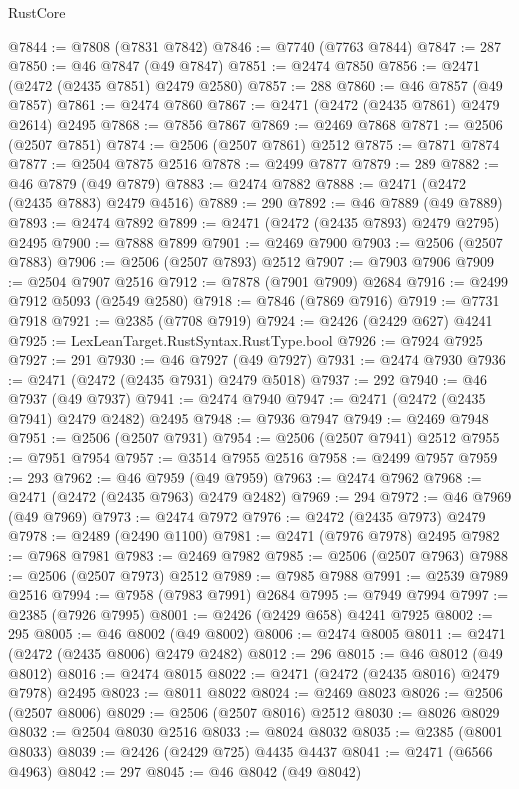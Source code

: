 \begin{lexlean}{RustCore}
\begin{coremodule}
@7844 := @7808 (@7831 @7842)
@7846 := @7740 (@7763 @7844)
@7847 := 287
@7850 := @46 @7847 (@49 @7847)
@7851 := @2474 @7850
@7856 := @2471 (@2472 (@2435 @7851) @2479 @2580)
@7857 := 288
@7860 := @46 @7857 (@49 @7857)
@7861 := @2474 @7860
@7867 := @2471 (@2472 (@2435 @7861) @2479 @2614) @2495
@7868 := @7856 @7867
@7869 := @2469 @7868
@7871 := @2506 (@2507 @7851)
@7874 := @2506 (@2507 @7861) @2512
@7875 := @7871 @7874
@7877 := @2504 @7875 @2516
@7878 := @2499 @7877
@7879 := 289
@7882 := @46 @7879 (@49 @7879)
@7883 := @2474 @7882
@7888 := @2471 (@2472 (@2435 @7883) @2479 @4516)
@7889 := 290
@7892 := @46 @7889 (@49 @7889)
@7893 := @2474 @7892
@7899 := @2471 (@2472 (@2435 @7893) @2479 @2795) @2495
@7900 := @7888 @7899
@7901 := @2469 @7900
@7903 := @2506 (@2507 @7883)
@7906 := @2506 (@2507 @7893) @2512
@7907 := @7903 @7906
@7909 := @2504 @7907 @2516
@7912 := @7878 (@7901 @7909) @2684
@7916 := @2499 @7912 @5093 (@2549 @2580)
@7918 := @7846 (@7869 @7916)
@7919 := @7731 @7918
@7921 := @2385 (@7708 @7919)
@7924 := @2426 (@2429 @627) @4241
@7925 := LexLeanTarget.RustSyntax.RustType.bool
@7926 := @7924 @7925
@7927 := 291
@7930 := @46 @7927 (@49 @7927)
@7931 := @2474 @7930
@7936 := @2471 (@2472 (@2435 @7931) @2479 @5018)
@7937 := 292
@7940 := @46 @7937 (@49 @7937)
@7941 := @2474 @7940
@7947 := @2471 (@2472 (@2435 @7941) @2479 @2482) @2495
@7948 := @7936 @7947
@7949 := @2469 @7948
@7951 := @2506 (@2507 @7931)
@7954 := @2506 (@2507 @7941) @2512
@7955 := @7951 @7954
@7957 := @3514 @7955 @2516
@7958 := @2499 @7957
@7959 := 293
@7962 := @46 @7959 (@49 @7959)
@7963 := @2474 @7962
@7968 := @2471 (@2472 (@2435 @7963) @2479 @2482)
@7969 := 294
@7972 := @46 @7969 (@49 @7969)
@7973 := @2474 @7972
@7976 := @2472 (@2435 @7973) @2479
@7978 := @2489 (@2490 @1100)
@7981 := @2471 (@7976 @7978) @2495
@7982 := @7968 @7981
@7983 := @2469 @7982
@7985 := @2506 (@2507 @7963)
@7988 := @2506 (@2507 @7973) @2512
@7989 := @7985 @7988
@7991 := @2539 @7989 @2516
@7994 := @7958 (@7983 @7991) @2684
@7995 := @7949 @7994
@7997 := @2385 (@7926 @7995)
@8001 := @2426 (@2429 @658) @4241 @7925
@8002 := 295
@8005 := @46 @8002 (@49 @8002)
@8006 := @2474 @8005
@8011 := @2471 (@2472 (@2435 @8006) @2479 @2482)
@8012 := 296
@8015 := @46 @8012 (@49 @8012)
@8016 := @2474 @8015
@8022 := @2471 (@2472 (@2435 @8016) @2479 @7978) @2495
@8023 := @8011 @8022
@8024 := @2469 @8023
@8026 := @2506 (@2507 @8006)
@8029 := @2506 (@2507 @8016) @2512
@8030 := @8026 @8029
@8032 := @2504 @8030 @2516
@8033 := @8024 @8032
@8035 := @2385 (@8001 @8033)
@8039 := @2426 (@2429 @725) @4435 @4437
@8041 := @2471 (@6566 @4963)
@8042 := 297
@8045 := @46 @8042 (@49 @8042)

\end{coremodule}
\end{lexlean}
